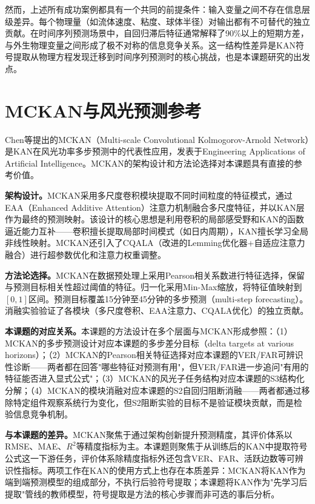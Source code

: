 然而，上述所有成功案例都具有一个共同的前提条件：输入变量之间不存在信息层级差异。每个物理量（如流体速度、粘度、球体半径）对输出都有不可替代的独立贡献。在时间序列预测场景中，自回归滞后特征通常解释了90\%以上的短期方差，与外生物理变量之间形成了极不对称的信息竞争关系。这一结构性差异是KAN符号提取从物理方程发现迁移到时间序列预测时的核心挑战，也是本课题研究的出发点。

\section{MCKAN与风光预测参考}

Chen等\cite{chen2025mckan}提出的MCKAN（Multi-scale Convolutional Kolmogorov-Arnold Network）是KAN在风光功率多步预测中的代表性应用，发表于Engineering Applications of Artificial Intelligence。MCKAN的架构设计和方法论选择对本课题具有直接的参考价值。

\textbf{架构设计。}MCKAN采用多尺度卷积模块提取不同时间粒度的特征模式，通过EAA（Enhanced Additive Attention）注意力机制融合多尺度特征，并以KAN层作为最终的预测映射。该设计的核心思想是利用卷积的局部感受野和KAN的函数逼近能力互补——卷积擅长提取局部时间模式（如日内周期），KAN擅长学习全局非线性映射。MCKAN还引入了CQALA（改进的Lemming优化器+自适应注意力融合）进行超参数优化和注意力权重调整。

\textbf{方法论选择。}MCKAN在数据预处理上采用Pearson相关系数进行特征选择，保留与预测目标相关性超过阈值的特征。归一化采用Min-Max缩放，将特征值映射到$[0, 1]$区间。预测目标覆盖15分钟至45分钟的多步预测（multi-step forecasting）。消融实验验证了各模块（多尺度卷积、EAA注意力、CQALA优化）的独立贡献。

\textbf{本课题的对应关系。}本课题的方法设计在多个层面与MCKAN形成参照：（1）MCKAN的多步预测设计对应本课题的多步差分目标（delta targets at various horizons）；（2）MCKAN的Pearson相关特征选择对应本课题的VER/FAR可辨识性诊断——两者都在回答"哪些特征对预测有用"，但VER/FAR进一步追问"有用的特征能否进入显式公式"；（3）MCKAN的风光子任务结构对应本课题的S3结构化分解；（4）MCKAN的模块消融对应本课题的S2自回归阻断消融——两者都通过移除特定组件观察系统行为变化，但S2阻断实验的目标不是验证模块贡献，而是检验信息竞争机制。

\textbf{与本课题的差异。}MCKAN聚焦于通过架构创新提升预测精度，其评价体系以RMSE、MAE、$R^2$等精度指标为主。本课题则聚焦于从训练后的KAN中提取符号公式这一下游任务，评价体系除精度指标外还包含VER、FAR、活跃边数等可辨识性指标。两项工作在KAN的使用方式上也存在本质差异：MCKAN将KAN作为端到端预测模型的组成部分，不执行后验符号提取；本课题将KAN作为"先学习后提取"管线的教师模型，符号提取是方法的核心步骤而非可选的事后分析。


